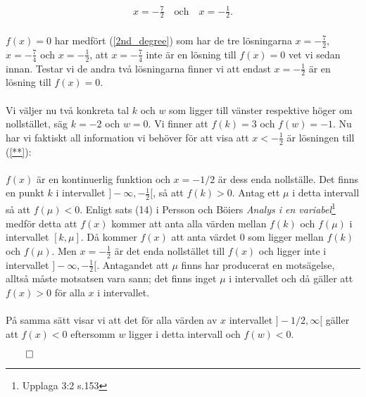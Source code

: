 \documentclass{article}
\begin{document}
\begin{gather*}
  x = -\frac{7}{2} \quad \text{och} \quad x = - \frac{1}{2}\text{.}
\end{gather*}
\\
$f(x) = 0$ har medfört (\ref{2nd_degree}) som har de tre lösningarna $x = -\tfrac{7}{2}$, $x = -\tfrac{7}{4}$ och $x = -\tfrac{1}{2}$, att $x = -\tfrac{7}{4}$ inte är en lösning till $f(x) = 0$ vet vi sedan innan. Testar vi de andra två lösningarna finner vi att endast $x = -\tfrac{1}{2}$ är en lösning till $f(x) = 0$.
\\
\\
Vi väljer nu två konkreta tal $k$ och $w$ som ligger till vänster respektive höger om nollstället, säg $k = -2$ och $w = 0$. Vi finner att $f(k) = 3$ och $f(w) = -1$. Nu har vi faktiskt all information vi behöver för att visa att $x < -\tfrac{1}{2}$ är lösningen till (\ref{**}):
\\
\\
$f(x)$ är en kontinuerlig funktion och $x = -1/2$ är dess enda nollställe. Det finns en punkt $k$ i intervallet $]-\infty, -\tfrac{1}{2}[$, så att $f(k) > 0$. Antag ett $\mu$ i detta intervall så att $f(\mu) < 0$. Enligt sats (14) i Persson och Böiers \emph{Analys i en variabel}\footnote{Upplaga 3:2 s.153} medför detta att $f(x)$ kommer att anta alla värden mellan $f(k)$ och $f(\mu)$ i intervallet $[k, \mu]$. Då kommer $f(x)$ att anta värdet $0$ som ligger mellan $f(k)$ och $f(\mu)$. Men $x = -\tfrac{1}{2}$ är det enda nollstället till $f(x)$ och ligger inte i intervallet $]-\infty, -\tfrac{1}{2}[$. Antagandet att $\mu$ finns har producerat en motsägelse, alltså måste motsatsen vara sann; det finns inget $\mu$ i intervallet och då gäller att $f(x) > 0$ för alla $x$ i intervallet.
\\
\\På samma sätt visar vi att det för alla värden av $x$ intervallet $ ]-1/2, \infty[$ gäller att $f(x) < 0$ eftersomm $w$ ligger i detta intervall och $f(w) < 0$.

\centerline{$\qed$}
\end{document}
